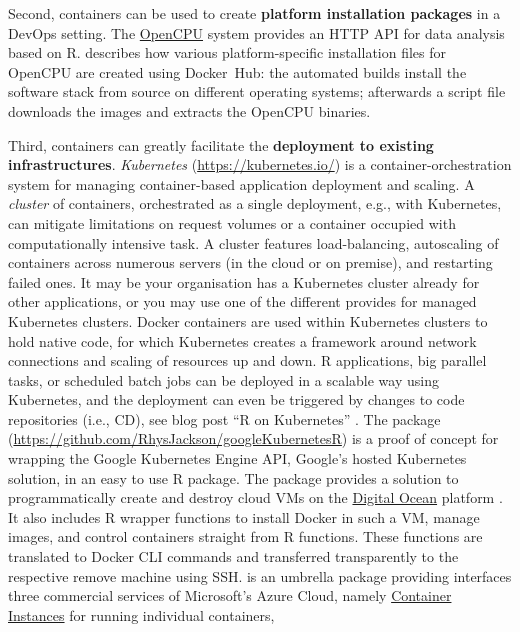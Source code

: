 Second, containers can be used to create \textbf{platform installation
packages} in a DevOps setting. The
\href{https://www.opencpu.org/}{OpenCPU} system provides an HTTP API for
data analysis based on R. \citet{ooms_opencpu_2017} describes how
various platform-specific installation files for OpenCPU are created
using Docker~Hub: the automated builds install the software stack from
source on different operating systems; afterwards a script file
downloads the images and extracts the OpenCPU binaries.

Third, containers can greatly facilitate the \textbf{deployment to
existing infrastructures}. \emph{Kubernetes}
(\url{https://kubernetes.io/}) is a container-orchestration system for
managing container-based application deployment and scaling. A
\emph{cluster} of containers, orchestrated as a single deployment, e.g.,
with Kubernetes, can mitigate limitations on request volumes or a
container occupied with computationally intensive task. A cluster
features load-balancing, autoscaling of containers across numerous
servers (in the cloud or on premise), and restarting failed ones. It may
be your organisation has a Kubernetes cluster already for other
applications, or you may use one of the different provides for managed
Kubernetes clusters. Docker containers are used within Kubernetes
clusters to hold native code, for which Kubernetes creates a framework
around network connections and scaling of resources up and down. R
applications, big parallel tasks, or scheduled batch jobs can be
deployed in a scalable way using Kubernetes, and the deployment can even
be triggered by changes to code repositories (i.e., CD), see blog post
``R on Kubernetes'' \citep{edmondson_r_2018}. The package
(\url{https://github.com/RhysJackson/googleKubernetesR}) is a proof of
concept for wrapping the Google Kubernetes Engine API, Google's hosted
Kubernetes solution, in an easy to use R package. The package
 provides a solution to programmatically create and
destroy cloud VMs on the \href{https://www.digitalocean.com/}{Digital
Ocean} platform \citep{analogsea_2019}. It also includes R wrapper
functions to install Docker in such a VM, manage images, and control
containers straight from R functions. These functions are translated to
Docker CLI commands and transferred transparently to the respective
remove machine using SSH.  is an umbrella
package providing interfaces three commercial services of Microsoft's
Azure Cloud, namely
\href{https://azure.microsoft.com/en-us/services/container-instances/}{Container
Instances} for running individual containers,
